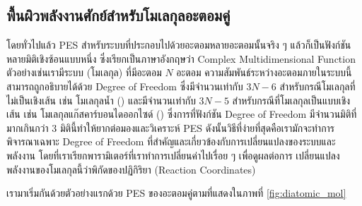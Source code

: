 \subsection{พื้นผิวพลังงานศักย์สำหรับโมเลกุลอะตอมคู่}
\label{ssec:pes_di_atomic}

โดยทั่วไปแล้ว PES สำหรับระบบที่ประกอบไปด้วยอะตอมหลายอะตอมนั้นจริง ๆ แล้วก็เป็นฟังก์ชันหลายมิติเชิงซ้อนแบบหนึ่ง ซึ่งเรียกเป็นภาษาอังกฤษว่า
Complex Multidimensional Function ตัวอย่างเช่นเรามีระบบ (โมเลกุล) ที่มีอะตอม $N$ อะตอม ความสัมพันธ์ระหว่างอะตอมภายในระบบนี้%
สามารถถูกอธิบายได้ด้วย Degree of Freedom ซึ่งมีจำนวนเท่ากับ $3N-6$ สำหรับกรณีโมเลกุลที่ไม่เป็นเชิงเส้น เช่น โมเลกุลน้ำ () 
และมีจำนวนเท่ากับ $3N-5$ สำหรับกรณีที่โมเลกุลเป็นแบบเชิงเส้น เช่น โมเลกุลแก๊สคาร์บอนไดออกไซด์ () ซึ่งการที่ฟังก์ชัน Degree 
of Freedom มีจำนวนมิติที่มากเกินกว่า 3 มิตินี้ทำให้ยากต่อมองและวิเคราะห์ PES ดังนั้นวิธีที่ง่ายที่สุดคือเรามักจะทำการพิจารณาเฉพาะ Degree of 
Freedom ที่สำคัญและเกี่ยวข้องกับการเปลี่ยนแปลงของระบบและพลังงาน โดยที่เราเรียกพารามิเตอร์ที่เราทำการเปลี่ยนค่าไปเรื่อย ๆ เพื่อดูผลต่อการ%
เปลี่ยนแปลงพลังงานของโมเลกุลนี้ว่าพิกัดของปฏิกิริยา (Reaction Coordinates) 

เรามาเริ่มกันด้วยตัวอย่างแรกด้วย PES ของอะตอมคู่ตามที่แสดงในภาพที่ \ref{fig:diatomic_mol}

